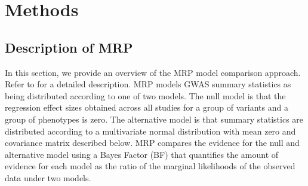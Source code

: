 \section*{Methods}

\subsection*{Description of MRP}
In this section, we provide an overview of the MRP model comparison approach. Refer to  for a detailed description. MRP models GWAS summary statistics as being distributed according to one of two models. The null model is that the regression effect sizes obtained across all studies for a group of variants and a group of phenotypes is zero. The alternative model is that summary statistics are distributed according to a multivariate normal distribution with mean zero and covariance matrix described below. MRP compares the evidence for the null and alternative model using a Bayes Factor (BF) that quantifies the amount of evidence for each model as the ratio of the marginal likelihoods of the observed data under two models. 

